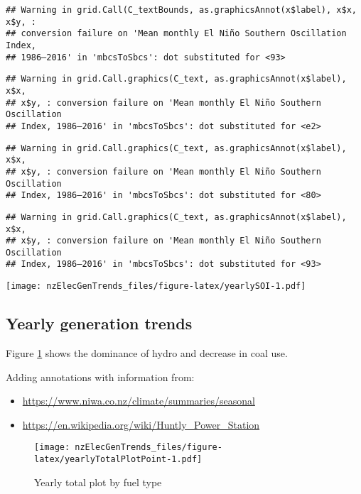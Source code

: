 \documentclass[]{article}
\providecommand{\tightlist}{%
  \setlength{\itemsep}{0pt}\setlength{\parskip}{0pt}}
\theoremstyle{definition}
\theoremstyle{definition}
\theoremstyle{definition}
\theoremstyle{remark}
\begin{document}
\begin{verbatim}
## Warning in grid.Call(C_textBounds, as.graphicsAnnot(x$label), x$x, x$y, :
## conversion failure on 'Mean monthly El Niño Southern Oscillation Index,
## 1986–2016' in 'mbcsToSbcs': dot substituted for <93>
\end{verbatim}

\begin{verbatim}
## Warning in grid.Call.graphics(C_text, as.graphicsAnnot(x$label), x$x,
## x$y, : conversion failure on 'Mean monthly El Niño Southern Oscillation
## Index, 1986–2016' in 'mbcsToSbcs': dot substituted for <e2>
\end{verbatim}

\begin{verbatim}
## Warning in grid.Call.graphics(C_text, as.graphicsAnnot(x$label), x$x,
## x$y, : conversion failure on 'Mean monthly El Niño Southern Oscillation
## Index, 1986–2016' in 'mbcsToSbcs': dot substituted for <80>
\end{verbatim}

\begin{verbatim}
## Warning in grid.Call.graphics(C_text, as.graphicsAnnot(x$label), x$x,
## x$y, : conversion failure on 'Mean monthly El Niño Southern Oscillation
## Index, 1986–2016' in 'mbcsToSbcs': dot substituted for <93>
\end{verbatim}

\texttt{[image: nzElecGenTrends\_files/figure-latex/yearlySOI-1.pdf]}

\subsection{Yearly generation trends}\label{yearly-generation-trends}

Figure \ref{fig:yearlyTotalPlotPoint} shows the dominance of hydro and
decrease in coal use.

Adding annotations with information from:

\begin{itemize}
\tightlist
\item
  \url{https://www.niwa.co.nz/climate/summaries/seasonal}
\item
  \url{https://en.wikipedia.org/wiki/Huntly_Power_Station}
\end{itemize}

\begin{figure}
\centering
\texttt{[image: nzElecGenTrends\_files/figure-latex/yearlyTotalPlotPoint-1.pdf]}
\caption{\label{fig:yearlyTotalPlotPoint}Yearly total plot by fuel type}
\end{figure}
\end{document}
